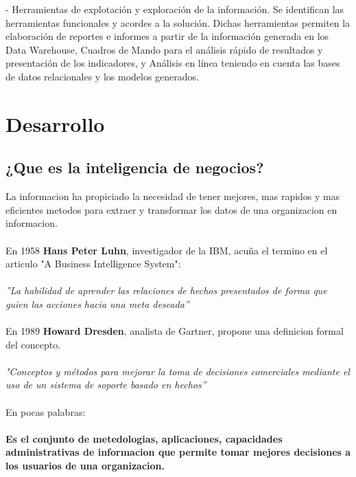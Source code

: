 \documentclass[twoside,twocolumn]{article}
\begin{document}
\begin{itemize}
- Herramientas de explotación y exploración de la información. Se
identifican las herramientas funcionales y acordes a la solución. Dichas
herramientas permiten la elaboración de reportes e informes a partir de la
información generada en los Data Warehouse, Cuadros de Mando para el análisis
rápido de resultados y presentación de los indicadores, y Análisis en línea
teniendo en cuenta las bases de datos relacionales y los modelos generados. \\




\end{itemize}




\section{Desarrollo}

\subsection{¿Que es la inteligencia de negocios?}

La informacion ha propiciado la necesidad de tener mejores, mas rapidos y mas eficientes metodos para extraer y transformar los datos de una organizacion en informacion.
\\ \\
En 1958 \textbf{Hans Peter Luhn}, investigador de la IBM, acuña el termino en el articulo "A Business Intelligence System":
\\ \\
\textsl{''La habilidad de aprender las relaciones de hechos presentados de forma que guien las acciones hacia una meta deseada''}
\\ \\
En 1989 \textbf{Howard Dresden}, analista de Gartner, propone una definicion formal del concepto.
\\ \\
\textsl{"Conceptos y métodos para mejorar la toma de decisiones comerciales mediante el uso de un sistema de soporte basado en hechos''}
\\ \\
En pocas palabras: \\ \\
\textbf{Es el conjunto de metedologias, aplicaciones, capacidades administrativas de informacion que permite tomar mejores decisiones a los usuarios de una organizacion.}
\end{document}
